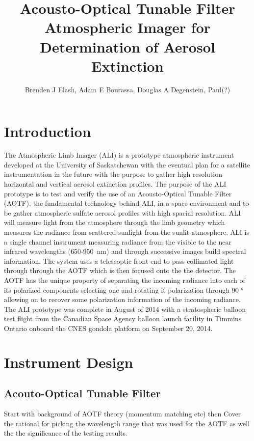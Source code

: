 \documentclass[11pt]{article}
\title{Acousto-Optical Tunable Filter Atmospheric Imager for Determination of Aerosol Extinction}
\author{Brenden J Elash, Adam E Bourassa, Douglas A Degenstein, Paul(?) }
\begin{document}
\maketitle

\section{Introduction}

The Atmospheric Limb Imager (ALI) is a prototype atmospheric instrument developed at the University of Saskatchewan with the eventual plan for a satellite instrumentation in the future with the purpose to gather high resolution horizontal and vertical aerosol extinction profiles. The purpose of the ALI prototype is to test and verify the use of an Acousto-Optical Tunable Filter (AOTF), the fundamental technology behind ALI, in a space environment and to be gather atmospheric sulfate aerosol profiles with high spacial resolution. ALI will measure light from the atmosphere through the limb geometry which measures the radiance from scattered sunlight from the sunlit atmosphere. ALI is a single channel instrument measuring radiance from the visible to the near infrared wavelengths (650-950~nm) and through successive images build spectral information. The system uses a telescoptic front end to pass collimated light through through the AOTF which is then focused onto the the detector. The AOTF has the unique property of separating the incoming radiance into each of its polarized components selecting one and rotating it polarization through 90 \si{\degree} allowing on to recover some polarization information of the incoming radiance. The ALI prototype was complete in August of 2014 with a stratospheric balloon test flight from the Canadian Space Agency balloon launch facility in Timmins Ontario onboard the CNES gondola platform on September 20, 2014.

\section{Instrument Design}

\subsection{Acouto-Optical Tunable Filter}

Start with background of AOTF theory (momentum matching etc) then Cover the rational for picking the wavelength range that was used for the AOTF as well the the significance of the testing results.
\end{document}
